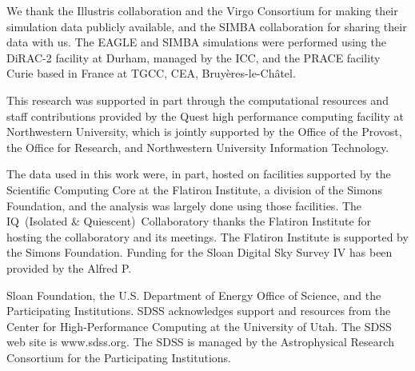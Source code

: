 \documentclass[12pt, letterpaper, preprint, comicneue]{aastex63}
\begin{document}
We thank the Illustris collaboration and the Virgo Consortium for making their
simulation data publicly available, and the SIMBA collaboration for sharing
their data with us.
The EAGLE and SIMBA simulations were performed using the DiRAC-2 facility at
Durham, managed by the ICC, and the PRACE facility Curie based in France at
TGCC, CEA, Bruy\`{e}res-le-Ch\^{a}tel.

This research was supported in part through the computational resources and
staff contributions provided by the Quest high performance computing facility
at Northwestern University, which is jointly supported by the Office of the
Provost, the Office for Research, and Northwestern University Information
Technology. 

The data used in this work were, in part, hosted on facilities supported by the
Scientific Computing Core at the Flatiron Institute, a division of the Simons
Foundation, and the analysis was largely done using those facilities.
The IQ~(Isolated \& Quiescent)~Collaboratory thanks the Flatiron Institute for hosting the collaboratory and its meetings. 
The Flatiron Institute is supported by the Simons Foundation.
Funding for the Sloan Digital Sky Survey IV has been provided by the Alfred P.

Sloan Foundation, the U.S. Department of Energy Office of Science, and the
Participating Institutions. SDSS acknowledges support and resources from the
Center for High-Performance Computing at the University of Utah. The SDSS web
site is www.sdss.org.
The SDSS is managed by the Astrophysical Research Consortium for the
Participating Institutions.

\appendix
%
% 
 


 
\end{document}
